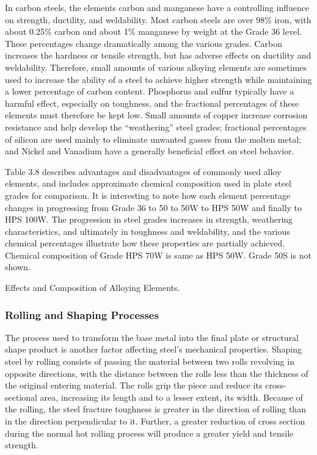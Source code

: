 In carbon steels, the elements carbon and manganese have a controlling influence on strength, ductility, and weldability. Most carbon steels are over 98\% iron, with about 0.25\% carbon and about 1\% manganese by weight at the Grade 36 level. These percentages change dramatically among the various grades. Carbon increases the hardness or tensile strength, but has adverse effects on ductility and weldability. Therefore, small amounts of various alloying elements are sometimes used to increase the ability of a steel to achieve higher strength while maintaining a lower percentage of carbon content. Phosphorus and sulfur typically have a harmful effect, especially on toughness, and the fractional percentages of these elements must therefore be kept low. Small amounts of copper increase corrosion resistance and help develop the “weathering” steel grades; fractional percentages of silicon are used mainly to eliminate unwanted gasses from the molten metal; and Nickel and Vanadium have a generally beneficial effect on steel behavior.

Table 3.8 describes advantages and disadvantages of commonly used alloy elements, and includes approximate chemical composition used in plate steel grades for comparison. It is interesting to note how each element percentage changes in progressing from Grade 36 to 50 to 50W to HPS 50W and finally to HPS 100W. The progression in steel grades increases in strength, weathering characteristics, and ultimately in toughness and weldability, and the various chemical percentages illustrate how these properties are partially achieved. Chemical composition of Grade HPS 70W is same as HPS 50W. Grade 50S is not shown.

\begin{table}
  \caption{Effects and Composition of Alloying Elements.}\label{tab:effect-alloy-elements}
\end{table}

\subsubsection{Rolling and Shaping Processes}
The process used to transform the base metal into the final plate or structural shape product is another factor affecting steel’s mechanical properties. Shaping steel by rolling consists of passing the material between two rolls revolving in opposite directions, with the distance between the rolls less than the thickness of the original entering material. The rolls grip the piece and reduce its cross-sectional area, increasing its length and to a lesser extent, its width. Because of the rolling, the steel fracture toughness is greater in the direction of rolling than in the direction perpendicular to it. Further, a greater reduction of cross section during the normal hot rolling process will produce a greater yield and tensile strength.

